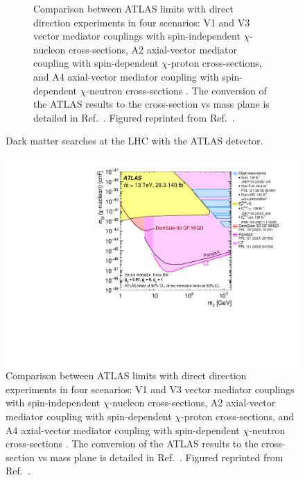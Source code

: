 \begin{figure}[!ht]
\begin{subfigure}{0.56\textwidth}
         \caption{Comparison between ATLAS limits with direct direction experiments in four scenarios: V1 and V3 vector mediator couplings with spin-independent $\chi$-nucleon cross-sections, A2 axial-vector mediator coupling with spin-dependent $\chi$-proton cross-sections, and A4 axial-vector mediator coupling with spin-dependent $\chi$-neutron cross-sections \cite{ATLAS:2024kpy}. The conversion of the ATLAS results to the cross-section vs mass plane is detailed in Ref.~\cite{Boveia:2016mrp}. Figured reprinted from Ref.~\cite{ATLAS:2024kpy}.}
         \label{fig:DMOverview/ATLASDMSearch}
     \end{subfigure}
     \caption{Dark matter searches at the LHC with the ATLAS detector.}
     \label{fig:DMOverview/ColliderTwoPanel}
\end{figure}

\iffalse
\begin{figure}[h!]
    \centering
    \includegraphics[width=0.7\linewidth]{figures/DMOverview/ATLASDMSearch.pdf}
    \caption{Comparison between ATLAS limits with direct direction experiments in four scenarios: V1 and V3 vector mediator couplings with spin-independent $\chi$-nucleon cross-sections, A2 axial-vector mediator coupling with spin-dependent $\chi$-proton cross-sections, and A4 axial-vector mediator coupling with spin-dependent $\chi$-neutron cross-sections \cite{ATLAS:2024kpy}. 
    The conversion of the ATLAS results to the cross-section vs mass plane is detailed in Ref.~\cite{Boveia:2016mrp}. Figured reprinted from Ref.~\cite{ATLAS:2024kpy}.}
    \label{fig:DMOverview/ATLASDMSearch}
\end{figure}

